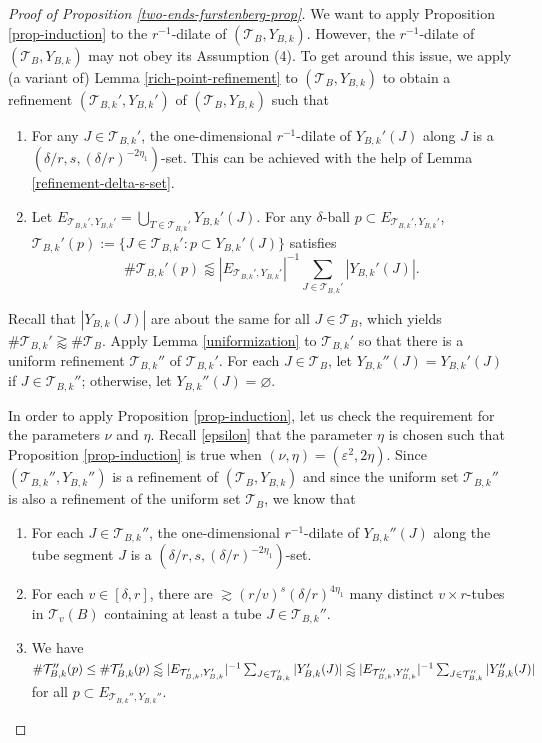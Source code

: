 \documentclass{amsart}
\numberwithin{equation}{section}
\newcommand{\de}{\delta}
\newcommand{\e}{\varepsilon}
\newcommand{\cT}{{\mathcal T}}
\begin{document}
\begin{proof}[Proof of Proposition \ref{two-ends-furstenberg-prop}]
\smallskip



We want to apply Proposition \ref{prop-induction} to the $r^{-1}$-dilate of $(\cT_B, Y_{B,k})$. 
However, the $r^{-1}$-dilate of $(\cT_B, Y_{B,k})$ may not obey its Assumption (4).   
To get around this issue, we apply (a variant of) Lemma \ref{rich-point-refinement} to $(\cT_B, Y_{B,k})$ to obtain a refinement $(\cT_{B,k}', Y_{B,k}')$ of $(\cT_B,Y_{B,k})$ such that
\begin{enumerate}
    \item For any $J\in\cT_{B,k}'$, the one-dimensional $r^{-1}$-dilate of $Y_{B,k}'(J)$ along $J$ is a $(\de/r, s, (\de/r)^{-2\eta_1})$-set. 
    This can be achieved with the help of Lemma \ref{refinement-delta-s-set}.
    \item Let $E_{\cT_{B,k}',Y_{B,k}'}=\bigcup_{T\in\cT_{B,k}'}Y_{B,k}'(J)$. For any $\de$-ball $p\subset E_{\cT_{B, k}', Y_{B, k}'}$, $\cT_{B,k}'(p):=\{J\in\cT_{B,k}':p\subset Y_{B,k}'(J) \}$ satisfies 
    \begin{equation}
        \#\cT_{B,k}'(p) \lessapprox|E_{\cT_{B,k}',Y_{B,k}'}|^{-1}\sum_{J\in\cT_{B,k}'}|Y_{B,k}'(J)|.
    \end{equation}
\end{enumerate}
Recall that $|Y_{B,k}(J)|$ are about the same for all $J\in\cT_B$, which yields $\#\cT_{B,k}'\gtrapprox\#\cT_B$. Apply Lemma \ref{uniformization} to $\cT_{B,k}'$ so that there is a uniform refinement $\cT_{B,k}''$ of $\cT_{B,k}'$.
For each $J\in\cT_B$, let  $Y_{B,k}''(J)=Y_{B,k}'(J)$ if $J\in \cT_{B,k}''$;  otherwise, let $Y_{B,k}''(J)=\varnothing$. 

\smallskip

In order to apply Proposition \ref{prop-induction}, let us check the requirement for the parameters $\nu$ and $\eta$. 
Recall \eqref{epsilon} that the parameter $\eta$ is chosen such that Proposition \ref{prop-induction} is true when $(\nu,\eta)=(\e^2,2\eta)$. 
Since $(\cT_{B,k}'', Y_{B,k}'')$ is a refinement of $(\cT_B, Y_{B,k})$ and since the uniform set $\cT_{B,k}''$ is also a refinement of the uniform set $\cT_B$, we know that
\begin{enumerate}
    \item For each $J\in\cT_{B,k}''$, the one-dimensional $r^{-1}$-dilate of $Y_{B,k}''(J)$ along the tube segment $J$ is a $(\de/r, s, (\de/r)^{-2\eta_1})$-set.
    \item For each $v\in[\de,r]$,  there are $\gtrsim (r/v)^{s}(\de/r)^{4\eta_1}$ many distinct $v\times r$-tubes in $\cT_v(B)$ containing at least a tube $J\in\cT_{B,k}''$. 
    \item We have $\#\cT_{B,k}''(p)\leq \#\cT_{B,k}'(p)\lessapprox|E_{\cT_{B,k}',Y_{B,k}'}|^{-1}\sum_{J\in\cT_{B,k}'}|Y_{B,k}'(J)|\lessapprox\\|E_{\cT_{B,k}'',Y_{B,k}''}|^{-1}\sum_{J\in\cT_{B,k}''}|Y_{B,k}''(J)|$ for all $ p\subset E_{\cT_{B,k}'',Y_{B,k}''}$.
\end{enumerate}


\end{proof}
\end{document}

